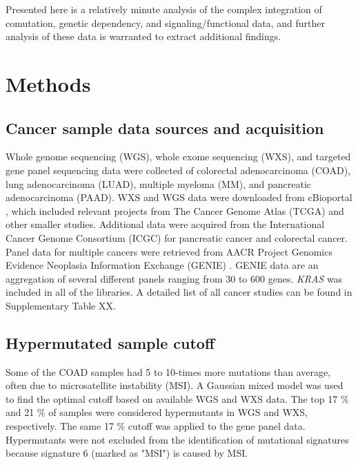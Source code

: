 \documentclass[english, 10pt, letterpaper]{article}
\newcommand{\KRAS}{\emph{KRAS}}
\begin{document}
Presented here is a relatively minute analysis of the complex integration of comutation, genetic dependency, and signaling/functional data, and further analysis of these data is warranted to extract additional findings.


\section*{Methods}

\subsection*{Cancer sample data sources and acquisition}

Whole genome sequencing (WGS), whole exome sequencing (WXS), and targeted gene panel sequencing data were collected of colorectal adenocarcinoma (COAD), lung adenocarcinoma (LUAD), multiple myeloma (MM), and pancreatic adenocarcinoma (PAAD).
WXS and WGS data were downloaded from cBioportal \cite{Gao2013, Cerami2012}, which included relevant projects from The Cancer Genome Atlas (TCGA) \cite{CancerGenomeAtlasNetwork2012, CancerGenomeAtlasResearchNetwork2014, CancerGenomeAtlasResearchNetwork.Electronicaddress:andrew_aguirredfci.harvard.edu2017} and other smaller studies. 
Additional data were acquired from the International Cancer Genome Consortium (ICGC) for pancreatic cancer \cite{Scarlett2011} and colorectal cancer. 
Panel data for multiple cancers were retrieved from AACR Project Genomics Evidence Neoplasia Information Exchange (GENIE) \cite{AACRProjectGENIEConsortium2017AACRConsortium.}.
GENIE data are an aggregation of several different panels ranging from 30 to 600 genes.
\KRAS{} was included in all of the libraries. 
A detailed list of all cancer studies can be found in Supplementary Table XX.


\subsection*{Hypermutated sample cutoff}

Some of the COAD samples had 5 to 10-times more mutations than average, often due to microsatellite instability (MSI). 
A Gaussian mixed model was used to find the optimal cutoff based on available WGS and WXS data. 
The top 17 \% and 21 \% of samples were considered hypermutants in WGS and WXS, respectively.
The same 17 \% cutoff was applied to the gene panel data. 
Hypermutants were not excluded from the identification of mutational signatures because signature 6 (marked as "MSI") is caused by MSI.
\end{document}
